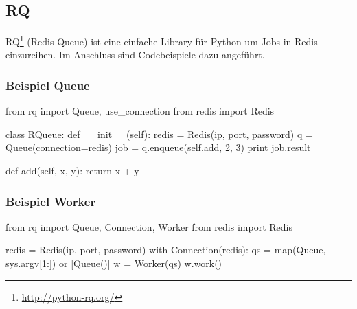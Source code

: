 \subsection{RQ}
RQ\footnote{\url{http://python-rq.org/}} (Redis Queue) ist eine einfache Library für Python um Jobs in Redis einzureihen. Im Anschluss sind Codebeispiele dazu angeführt.

\subsubsection{Beispiel Queue}
\begin{python}
from rq import Queue, use_connection
from redis import Redis

class RQueue:
   def __init__(self):
       redis = Redis(ip, port, password)
       q = Queue(connection=redis)
       job = q.enqueue(self.add, 2, 3)
       print job.result

   def add(self, x, y):
       return x + y
\end{python}

\subsubsection{Beispiel Worker}
\begin{python}
from rq import Queue, Connection, Worker
from redis import Redis

redis = Redis(ip, port, password)
with Connection(redis):
   qs = map(Queue, sys.argv[1:]) or [Queue()]
   w = Worker(qs)
   w.work()
\end{python}
\newpage